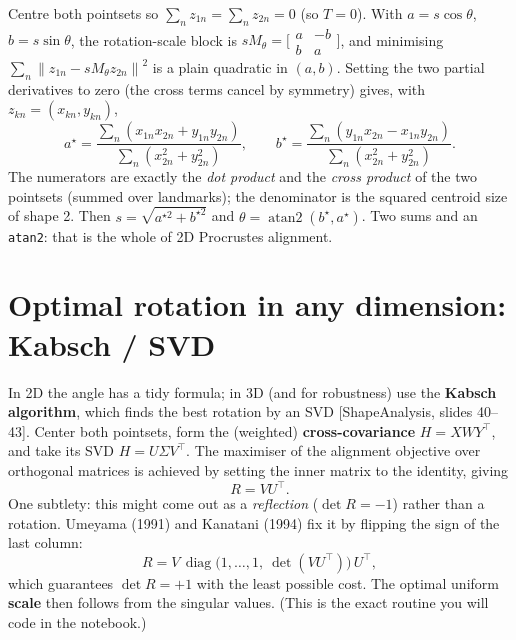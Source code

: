 \documentclass[11pt]{article}
\newcommand{\norm}[1]{\left\lVert #1 \right\rVert}
\newcommand{\deck}[1]{\textsf{\small[#1]}}
\begin{document}
\begin{notebox}
Centre both pointsets so $\sum_n z_{1n}=\sum_n z_{2n}=0$ (so $T=0$). With
$a=s\cos\theta$, $b=s\sin\theta$, the rotation-scale block is
$sM_\theta=\big[\begin{smallmatrix}a&-b\\ b&a\end{smallmatrix}\big]$, and
minimising $\sum_n\norm{z_{1n}-sM_\theta z_{2n}}^2$ is a plain quadratic in
$(a,b)$. Setting the two partial derivatives to zero (the cross terms cancel by
symmetry) gives, with $z_{kn}=(x_{kn},y_{kn})$,
\[
a^\star=\frac{\sum_n (x_{1n}x_{2n}+y_{1n}y_{2n})}{\sum_n (x_{2n}^2+y_{2n}^2)},
\qquad
b^\star=\frac{\sum_n (y_{1n}x_{2n}-x_{1n}y_{2n})}{\sum_n (x_{2n}^2+y_{2n}^2)} .
\]
The numerators are exactly the \emph{dot product} and the \emph{cross product}
of the two pointsets (summed over landmarks); the denominator is the squared
centroid size of shape 2. Then $s=\sqrt{a^{\star 2}+b^{\star 2}}$ and
$\theta=\operatorname{atan2}(b^\star,a^\star)$. Two sums and an
\texttt{atan2}: that is the whole of 2D Procrustes alignment.
\end{notebox}

\section{Optimal rotation in any dimension: Kabsch / SVD}

In 2D the angle has a tidy formula; in 3D (and for robustness) use the
\textbf{Kabsch algorithm}, which finds the best rotation by an SVD
\deck{ShapeAnalysis, slides 40--43}. Center both pointsets, form the (weighted)
\textbf{cross-covariance} $H = X W Y^{\!\top}$, and take its SVD $H=U\Sigma V^{\!\top}$.
The maximiser of the alignment objective over orthogonal matrices is achieved
by setting the inner matrix to the identity, giving
\[
R = V U^{\!\top}.
\]
One subtlety: this might come out as a \emph{reflection} ($\det R = -1$) rather
than a rotation. Umeyama (1991) and Kanatani (1994) fix it by flipping the sign
of the last column:
\[
R = V \,\operatorname{diag}\!\big(1,\dots,1,\ \det(VU^{\!\top})\big)\, U^{\!\top},
\]
which guarantees $\det R = +1$ with the least possible cost. The optimal uniform
\textbf{scale} then follows from the singular values. (This is the exact routine
you will code in the notebook.)
\end{document}
